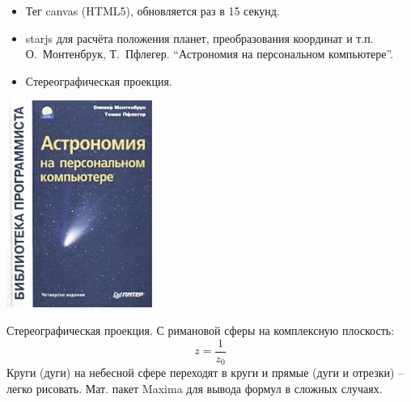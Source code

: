 \begin{frame}
  \begin{itemize}
  \item Тег canvas (HTML5), обновляется раз в 15 секунд.
  \item starjs для расчёта положения планет, преобразования координат
    и т.п.  О.~Монтенбрук, Т.~Пфлегер. ``Астрономия на персональном
    компьютере''.
  \item Стереографическая проекция.
  \end{itemize}

  \includegraphics[widht=0.4\textwidth]{astro.jpg}

  Стереографическая проекция.  С римановой сферы на комплексную
  плоскость:
  \begin{equation}
    z = \frac{1}{z_0}
  \end{equation}
  Круги (дуги) на небесной сфере переходят в круги и прямые (дуги и
  отрезки) -- легко рисовать.  Мат. пакет Maxima для вывода формул в
  сложных случаях.
\end{frame}
